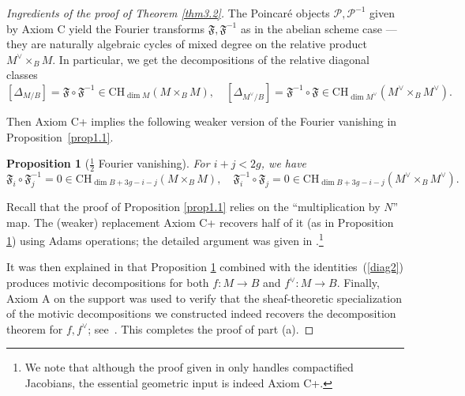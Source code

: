 \documentclass[11pt]{amsart}
\theoremstyle{plain}
\newtheorem{prop}[thm]{Proposition}
\theoremstyle{definition}
\theoremstyle{remark}
\newcommand{\CP}{{\mathcal P}}
\begin{document}
\begin{proof}[Ingredients of the proof of Theorem \ref{thm3.2}]
The Poincar\'e objects $\CP, \CP^{-1}$ given by Axiom C yield the Fourier transforms $\mathfrak{F}, \mathfrak{F}^{-1}$ as in the abelian scheme case --- they are naturally algebraic cycles of mixed degree on the relative product $M^\vee \times_B M$. In particular, we get the decompositions of the relative diagonal classes
\begin{equation}\label{diag2}
[\Delta_{M/B}] = \mathfrak{F} \circ \mathfrak{F}^{-1} \in \mathrm{CH}_{\dim M}(M \times_B M), \quad [\Delta_{M^\vee/B}] = \mathfrak{F}^{-1} \circ \mathfrak{F} \in \mathrm{CH}_{\dim M^\vee}(M^\vee\times_B M^\vee).
\end{equation}

Then Axiom C+ implies the following weaker version of the Fourier vanishing in Proposition~\ref{prop1.1}.

\begin{prop}[$\frac{1}{2}$ Fourier vanishing]\label{prop3.4}
   For $i+j < 2g$, we have
\[
\mathfrak{F}_i\circ \mathfrak{F}^{-1}_{j}=0 \in \mathrm{CH}_{\dim B + 3g -i-j}(M \times_B M), \quad \mathfrak{F}^{-1}_i \circ \mathfrak{F}_j = 0 \in \mathrm{CH}_{\dim B + 3g-i-j}(M^\vee \times_B M^\vee).
\]    
\end{prop}

Recall that the proof of Proposition \ref{prop1.1} relies on the ``multiplication by $N$'' map. The (weaker) replacement Axiom C+ recovers half of it (as in Proposition \ref{prop3.4}) using Adams operations; the detailed argument was given in \cite[Section 3.5]{MSY}.\footnote{We note that although the proof given in \cite[Section 3.5]{MSY} only handles compactified Jacobians, the essential geometric input is indeed Axiom C+.} 

It was then explained in \cite[Section 2.5.5]{MSY} that Proposition \ref{prop3.4} combined with the identities~(\ref{diag2}) produces motivic decompositions for both $f: M \to B$ and $f^\vee: M \to B$. Finally, Axiom A on the support was used to verify that the sheaf-theoretic specialization of the motivic decompositions we constructed indeed recovers the decomposition theorem for $f, f^\vee$; see~\cite[Section 2.5.2]{MSY}. This completes the proof of part (a).


\end{proof}
\end{document}
